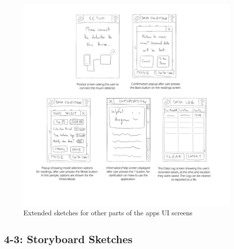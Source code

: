 \documentclass[11pt,a4paper]{article}
\begin{document}
\bigskip
\begin{figure}[h]
  \centering
      \includegraphics[width=1.2\textwidth]{elaboratingsketches.png}
  \caption{Extended sketches for other parts of the apps UI screens}
\end{figure}
\newpage
\subsection*{4-3: Storyboard Sketches}
\end{document}
